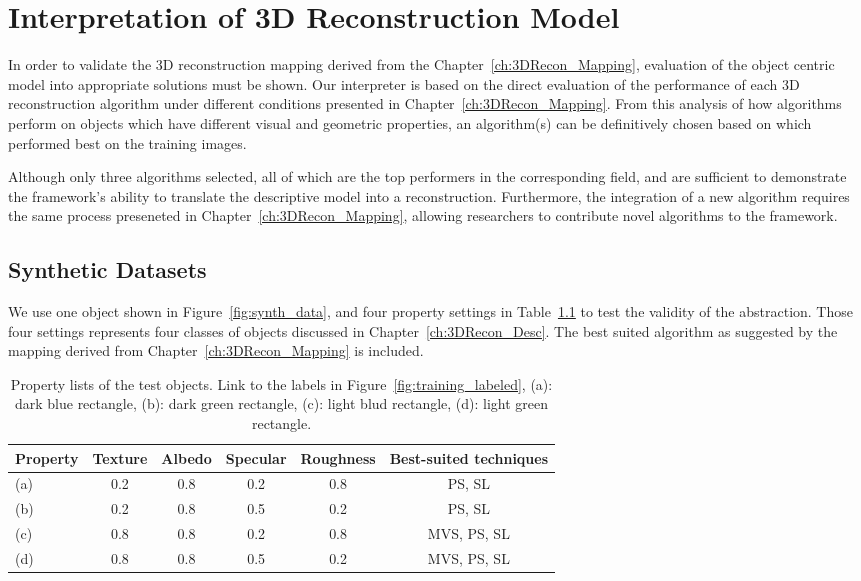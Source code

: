 
\chapter{Interpretation of 3D Reconstruction Model}
\label{ch:3DRecon_Interp}
In order to validate the 3D reconstruction mapping derived from the Chapter~\ref{ch:3DRecon_Mapping}, evaluation of the object centric model into appropriate solutions must be shown. Our interpreter is based on the direct evaluation of the performance of each 3D reconstruction algorithm under different conditions presented in Chapter~\ref{ch:3DRecon_Mapping}. From this analysis of how algorithms perform on objects which have different visual and geometric properties, an algorithm(s) can be definitively chosen based on which performed best on the training images.


Although only three algorithms selected, all of which are the top performers in the corresponding field, and are sufficient to demonstrate the framework's ability to translate the descriptive model into a reconstruction. Furthermore, the integration of a new algorithm requires the same process preseneted in Chapter~\ref{ch:3DRecon_Mapping}, allowing researchers to contribute novel algorithms to the framework.

\section{Synthetic Datasets}
We use one object shown in Figure~\ref{fig:synth_data}, and four property settings in Table~\ref{tab:prop_list_synth_data} to test the validity of the abstraction. Those four settings represents four classes of objects discussed in Chapter~\ref{ch:3DRecon_Desc}. The best suited algorithm as suggested by the mapping derived from Chapter~\ref{ch:3DRecon_Mapping} is included.
\begin{table}[h]
  \centering
  \begin{tabular}{l*{5}{c}}
  \hline
  \textbf{Property} & Texture & Albedo & Specular & Roughness & Best-suited techniques\\
  \hline
  (a) & 0.2 & 0.8 & 0.2 & 0.8 & PS, SL\\
  (b) & 0.2 & 0.8 & 0.5 & 0.2 & PS, SL\\
  (c) & 0.8 & 0.8 & 0.2 & 0.8 & MVS, PS, SL\\
  (d) & 0.8 & 0.8 & 0.5 & 0.2 & MVS, PS, SL\\
  \hline
  \end{tabular}
  \caption{Property lists of the test objects. Link to the labels in Figure~\ref{fig:training_labeled}, (a): dark blue rectangle, (b): dark green rectangle, (c): light blud rectangle, (d): light green rectangle.}
  \label{tab:prop_list_synth_data}
\end{table}

